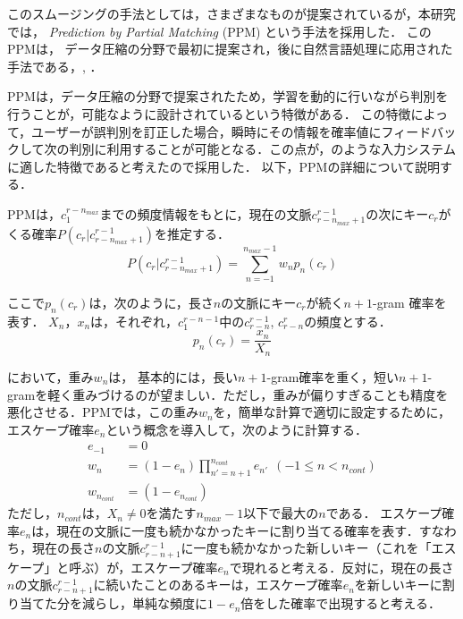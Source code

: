 \documentclass[japanese]{jnlp_1.4}
\newcommand{\name}{}
\renewcommand{\eqref}[1]{}
\begin{document}
このスムージングの手法としては，さまざまなものが提案されているが，本研究では，
{\em Prediction by Partial Matching} (PPM) という手法を採用した．
このPPMは，	データ圧縮の分野で最初に提案され，後に自然言語処理に応用された手法である\cite{textcomp}，\cite{teahan00}, \cite{nle06}．

PPMは，データ圧縮の分野で提案されたため，学習を動的に行いながら判別を行うことが，可能なように設計されているという特徴がある．
この特徴によって，ユーザーが誤判別を訂正した場合，瞬時にその情報を確率値にフィードバックして次の判別に利用することが可能となる．この点が，{\name}のような入力システムに適した特徴であると考えたので採用した．
以下，PPMの詳細について説明する．

PPMは，$c_1^{r-n_{max}}$までの頻度情報をもとに，現在の文脈$c_{r-n_{max}+1}^{r-1}$の次にキー$c_r$がくる確率$P(c_r|c_{r-n_{max}+1}^{r-1})$を推定する．
\begin{equation}
  P(c_r|c_{r-n_{max}+1}^{r-1}) = \sum_{n=-1}^{n_{max}-1} w_n p_n(c_r) \label{eq:weights}
\end{equation}

ここで$p_n(c_r)$は，次のように，長さ$n$の文脈にキー$c_{r}$が続く$n+1$-gram 確率を表す．
$X_n$，$x_n$は，それぞれ，$c_1^{r-n-1}$中の$c_{r-n}^{r-1}$, $c_{r-n}^r$の頻度とする．
\[
  p_n(c_r) = \frac{x_n}{X_n}
\]

\eqref{eq:weights}において，重み$w_n$は，
基本的には，長い$n+1$-gram確率を重く，短い$n+1$-gramを軽く重みづけるのが望ましい．ただし，重みが偏りすぎることも精度を悪化させる．PPMでは，この重み$w_n$を，簡単な計算で適切に設定するために，エスケープ確率$e_n$という概念を導入して，次のように計算する．
\begin{equation} 
\begin{split}
  e_{-1}& =0\\
  w_n &= (1-e_n) \prod_{n' = n+1}^{n_{cont}} e_{n'} \ \ (-1 \le n < n_{cont}) 
  	\label{eq:ppm} \\
  w_{n_{cont}} &= (1-e_{n_{cont}})
\end{split}
\end{equation}
ただし，$n_{cont}$は，$X_n \ne 0$を満たす$n_{max}-1$以下で最大の$n$である．
エスケープ確率$e_n$は，現在の文脈に一度も続かなかったキーに割り当てる確率を表す．すなわち，現在の長さ$n$の文脈$c_{r-n+1}^{r-1}$に一度も続かなかった新しいキー（これを「エスケープ」と呼ぶ）が，エスケープ確率$e_n$で現れると考える．反対に，現在の長さ$n$の文脈$c_{r-n+1}^{r-1}$に続いたことのあるキーは，エスケープ確率$e_n$を新しいキーに割り当てた分を減らし，単純な頻度に$1-e_n$倍をした確率で出現すると考える．
\end{document}
